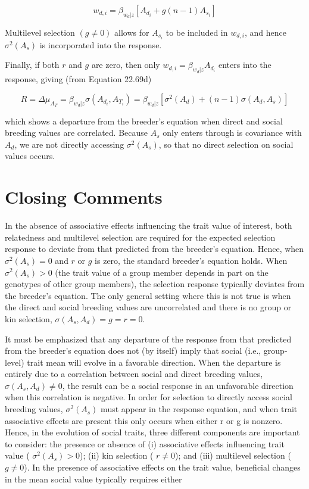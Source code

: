 \documentclass{article}
\begin{document}
\begin{equation}
w_{d,i}=\beta_{w_{d}|z}\left[A_{d_{i}}+g(n-1)A_{s_{i}}\right]
\tag{22.70b}
\label{eq:22_70b}
\end{equation}

Multilevel selection  $ (g \neq 0) $ allows for  $ A_{s_i} $ to be included in  $ w_{d,i} $, and hence  $ \sigma^2(A_s) $ is incorporated into the response.

Finally, if both $r$ and $g$ are zero, then only $w_{d,i} = \beta_{w_{d}|z} A_{d_i}$ enters into the response, giving (from Equation 22.69d)

\begin{equation}
R=\Delta\mu_{A_{T}}=\beta_{w_{d}|z}\sigma(A_{d_{i}},A_{T_{i}})=\beta_{w_{d}|z}\left[\sigma^{2}(A_{d})+(n-1)\sigma(A_{d},A_{s})\right]
\tag{22.70c}
\label{eq:22_70c}
\end{equation}

which shows a departure from the breeder’s equation when direct and social breeding values are correlated. Because  $ A_s $ only enters through is covariance with  $ A_d $, we are not directly accessing  $ \sigma^2(A_s) $, so that no direct selection on social values occurs.

\section{Closing Comments}
In the absence of associative effects influencing the trait value of interest, both relatedness and multilevel selection are required for the expected selection response to deviate from that predicted from the breeder's equation. Hence, when  $ \sigma^2(A_s) = 0 $ and  $ r $ or  $ g $ is zero, the standard breeder's equation holds. When  $ \sigma^2(A_s) > 0 $ (the trait value of a group member depends in part on the genotypes of other group members), the selection response typically deviates from the breeder's equation. The only general setting where this is not true is when the direct and social breeding values are uncorrelated and there is no group or kin selection,  $ \sigma(A_s, A_d) = g = r = 0 $.

It must be emphasized that any departure of the response from that predicted from the breeder's equation does not (by itself) imply that social (i.e., group-level) trait mean will evolve in a favorable direction. When the departure is entirely due to a correlation between social and direct breeding values,  $ \sigma(A_s, A_d) \neq 0 $, the result can be a social response in an unfavorable direction when this correlation is negative. In order for selection to directly access social breeding values,  $ \sigma^2(A_s) $ must appear in the response equation, and when trait associative effects are present this only occurs when either r or g is nonzero. Hence, in the evolution of social traits, three different components are important to consider: the presence or absence of (i) associative effects influencing trait value ( $ \sigma^2(A_s) > 0 $); (ii) kin selection ( $ r \neq 0 $); and (iii) multilevel selection ( $ g \neq 0 $). In the presence of associative effects on the trait value, beneficial changes in the mean social value typically requires either
\end{document}
